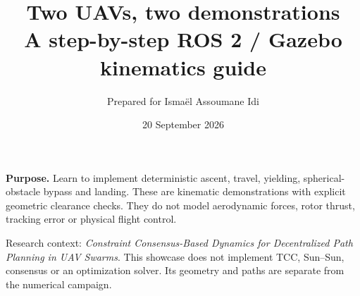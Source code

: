 \documentclass[11pt,a4paper]{article}
\title{\textcolor{campusred}{Two UAVs, two demonstrations}\\\large A step-by-step ROS 2 / Gazebo kinematics guide}
\author{Prepared for Isma\"el Assoumane Idi}
\date{20 September 2026}
\begin{document}
\maketitle
\textbf{Purpose.} Learn to implement deterministic ascent, travel, yielding, spherical-obstacle bypass and landing. These are kinematic demonstrations with explicit geometric clearance checks. They do not model aerodynamic forces, rotor thrust, tracking error or physical flight control.

Research context: \emph{Constraint Consensus-Based Dynamics for Decentralized Path Planning in UAV Swarms}. This showcase does not implement TCC, Sun--Sun, consensus or an optimization solver. Its geometry and paths are separate from the numerical campaign.
\setcounter{tocdepth}{1}{\small\setlength{\parskip}{0pt}\tableofcontents}\clearpage

\clearpage\appendix
\end{document}
